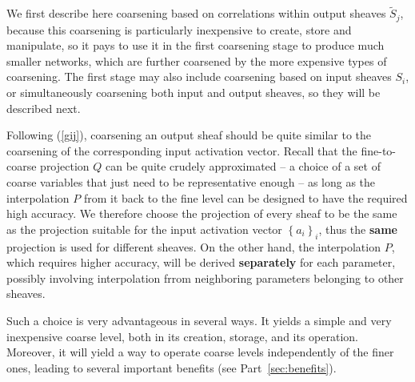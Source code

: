 \documentclass{article} %
\begin{document}

We first describe here coarsening based on correlations within output sheaves $\tilde{S}_j$, because this coarsening is particularly inexpensive to create, store and manipulate, so it pays to use it in the first coarsening stage to produce much smaller networks, which are further coarsened by the more expensive types of coarsening. The first stage may also include coarsening based on input sheaves $S_i$, or simultaneously coarsening both input and output sheaves, so they will be described next.

Following (\ref{gij}), coarsening an output sheaf should be quite similar to the coarsening of the corresponding input activation vector. Recall that the fine-to-coarse projection $Q$ can be quite crudely approximated -- a choice of a set of coarse variables that just need to be representative enough -- as long as the interpolation $P$ from it back to the fine level can be designed to have the required high accuracy. We therefore choose the projection of every sheaf to be the same as the projection suitable for the input activation vector $\left\{a_i\right\}_i$, thus the \textbf{same} projection is used for different sheaves. On the other hand, the interpolation $P$, which requires higher accuracy,  will be derived \textbf{separately} for each parameter, possibly involving interpolation frrom neighboring parameters belonging to other sheaves.

Such a choice is very advantageous in several ways. It yields a simple and very inexpensive coarse level, both in its creation, storage, and its operation. Moreover, it will yield a way to operate coarse levels independently of the finer ones, leading to several important benefits (see Part~\ref{sec:benefits}).
\end{document}
